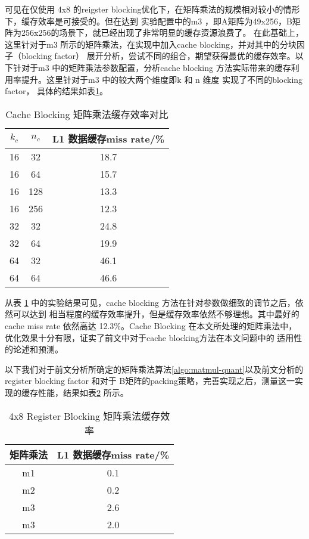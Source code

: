 可见在仅使用 4x8 的reigster blocking优化下，在矩阵乘法的规模相对较小的情形下，缓存效率是可接受的。但在达到
实验配置中的m3 ，即A矩阵为49x256，B矩阵为256x256的场景下，就已经出现了非常明显的缓存资源浪费了。
在此基础上，这里针对于m3 所示的矩阵乘法，在实现中加入cache blocking，并对其中的分块因子（blocking factor）
展开分析，尝试不同的组合，期望获得最优的缓存效率。以下针对于m3 中的矩阵乘法参数配置，分析cache blocking
方法实际带来的缓存利用率提升。这里针对于m3 中的较大两个维度即k 和 n 维度
实现了不同的blocking factor， 具体的结果如表\ref{tbl:4x8cbd1mr}。


\begin{table}[]
  \centering
  \caption{Cache Blocking 矩阵乘法缓存效率对比}
  \begin{tabular}{ccc}
    \toprule
    $k_c$ & $n_c$ & L1 数据缓存miss rate/\% \\
    \midrule
    16 & 32 & 18.7 \\
    16 & 64 & 15.7 \\
    16 & 128 & 13.3 \\
    16 & 256 & 12.3 \\
    32 & 32 & 24.8 \\
    32 & 64 & 19.9 \\
    64 & 32 & 46.1 \\
    64 & 64 & 46.6 \\
    \bottomrule
  \end{tabular}
  \label{tbl:4x8cbd1mr}
\end{table}

从表 \ref{tbl:4x8cbd1mr} 中的实验结果可见，cache blocking 方法在针对参数做细致的调节之后，依然可以达到
相当程度的缓存效率提升，但是缓存效率依然不够理想。其中最好的cache miss rate 依然高达 12.3\%。Cache 
Blocking 在本文所处理的矩阵乘法中，优化效果十分有限，证实了前文中对于cache blocking方法在本文问题中的
适用性的论述和预测。

以下我们对于前文分析所确定的矩阵乘法算法\ref{algo:matmul-quant}以及前文分析的register blocking factor 和对于
B矩阵的packing策略，完善实现之后，测量这一实现的缓存性能，结果如表\ref{tbl:8x8d1mr} 所示。

\begin{table}[]
  \centering
  \caption{4x8 Register Blocking 矩阵乘法缓存效率}
  \begin{tabular}{cc}
    \toprule
    矩阵乘法 & L1 数据缓存miss rate/\% \\
    \midrule
    m1  & 0.1 \\
    m2  & 0.2 \\
    m3  & 2.6 \\
    m3  & 2.0 \\
    \bottomrule
  \end{tabular}
  \label{tbl:8x8d1mr}
\end{table}

